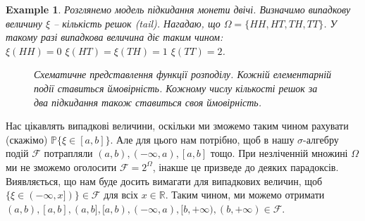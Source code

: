 \documentclass[a4paper, 10pt]{article}
\theoremstyle{theoremdd}
\newtheorem{definition}[theorem]{Definition}
\newtheorem{example}[theorem]{Example}
\begin{document}
\begin{example}
Розглянемо модель підкидання монети двічі. Визначимо випадкову величину $\xi$ -- кількість решок (tail). Нагадаю, що $\Omega = \{HH,HT,TH,TT\}$. У такому разі випадкова величина діє таким чином:\\
$\xi(HH) = 0$ \qquad $\xi(HT) = \xi(TH) = 1$ \qquad $\xi(TT) = 2$.
\begin{figure}[H]
\centering
{}
\caption*{Схематичне представлення функції розподілу. Кожній елементарній події ставиться ймовірність. Кожному числу кількості решок за два підкидання також ставиться своя ймовірність.}
\end{figure}
\end{example}
\noindent
Нас цікавлять випадкові величини, оскільки ми зможемо таким чином рахувати (скажімо) $\mathbb{P}\{\xi \in [a,b]\}$. Але для цього нам потрібно, щоб в нашу $\sigma$-алгебру подій $\mathcal{F}$ потрапляли $(a,b), (-\infty,a), [a,b]$ тощо. При незліченній множині $\Omega$ ми не зможемо оголосити $\mathcal{F} = 2^\Omega$, інакше це призведе до деяких парадоксів.\\
Виявляється, що нам буде досить вимагати для випадкових величин, щоб $\{\xi \in (-\infty,x])\} \in \mathcal{F}$ для всіх $x \in \mathbb{R}$. Таким чином, ми можемо отримати $(a,b),[a,b],(a,b],[a,b),(-\infty,a),[b,+\infty),(b,+\infty) \in \mathcal{F}$.

\iffalse
\begin{definition}
\textbf{Імовірнісним розподілом} випадкової величини $\xi$ називають таку міру:
\begin{align*}
P_\xi(B) = \mathbb{P}(\xi^{-1}(B)),\ B \in \mathcal{B}(\mathbb{R}),
\end{align*}
така міра визначена на просторі $(\mathbb{R}, \mathcal{B}(\mathbb{R}))$.
\end{definition}
\fi
\end{document}

